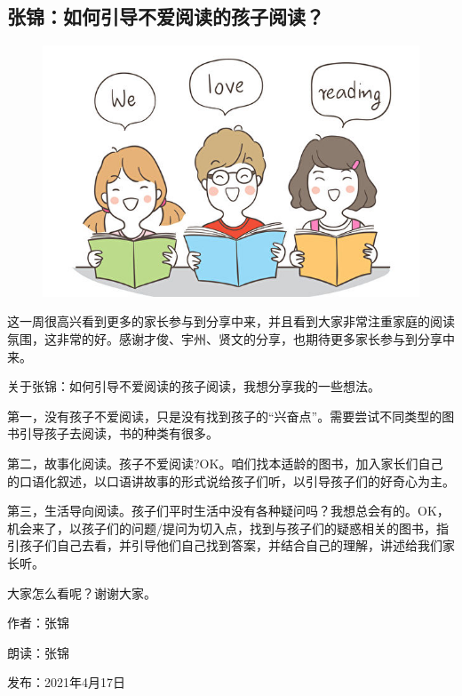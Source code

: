 \vspace{10pt}

{\centering\subsection*{张锦：如何引导不爱阅读的孩子阅读？}}


\renewcommand{\leftmark}{张锦：如何引导不爱阅读的孩子阅读？}

\begin{figure}[htbp]

\centering

\includegraphics[width = .5\textwidth]{./ch/v2.jpg}

\end{figure}




这一周很高兴看到更多的家长参与到分享中来，并且看到大家非常注重家庭的阅读氛围，这非常的好。感谢才俊、宇州、贤文的分享，也期待更多家长参与到分享中来。






关于张锦：如何引导不爱阅读的孩子阅读，我想分享我的一些想法。



第一，没有孩子不爱阅读，只是没有找到孩子的“兴奋点”。需要尝试不同类型的图书引导孩子去阅读，书的种类有很多。



第二，故事化阅读。孩子不爱阅读?OK。咱们找本适龄的图书，加入家长们自己的口语化叙述，以口语讲故事的形式说给孩子们听，以引导孩子们的好奇心为主。



第三，生活导向阅读。孩子们平时生活中没有各种疑问吗？我想总会有的。OK，机会来了，以孩子们的问题/提问为切入点，找到与孩子们的疑惑相关的图书，指引孩子们自己去看，并引导他们自己找到答案，并结合自己的理解，讲述给我们家长听。



大家怎么看呢？谢谢大家。

\vspace{10pt}

作者：张锦

朗读：张锦

发布：2021年4月17日



\vspace{10pt}

\hline

